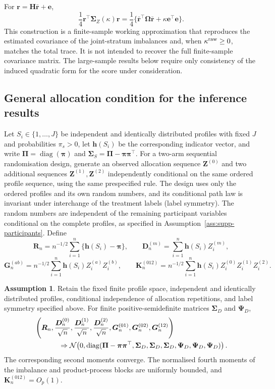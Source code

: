 \documentclass[12pt,a4paper]{article}
\theoremstyle{definition}
\newtheorem{assumption}{Assumption}
\theoremstyle{remark}\newtheorem{remark}{Remark}
\numberwithin{equation}{section}
\newcommand{\diag}{\operatorname{diag}}
\begin{document}
For $\bm r=\bm H\bar{\bm r}+\bm e$,
\begin{equation}\label{eq:supp-quadratic}
\frac14\bm r^\top\bm\Sigma_Z(\kappa)\bm r
=\frac14\{\bar{\bm r}^\top\bm\Omega\bar{\bm r}
+\kappa\bm e^\top\bm e\}.
\end{equation}
This construction is a finite-sample working approximation that reproduces the estimated covariance of the joint-stratum imbalances and, when $\kappa^{\rm raw}\ge0$, matches the total trace. It is not intended to recover the full finite-sample covariance matrix. The large-sample results below require only consistency of the induced quadratic form for the score under consideration.

\subsection{General allocation condition for the inference results}\label{sec:supp-general-allocation}
Let $S_i\in\{1,\ldots,J\}$ be independent and identically distributed profiles with fixed $J$ and probabilities $\pi_s>0$, let $\bm h(S_i)$ be the corresponding indicator vector, and write $\bm\Pi=\diag(\bm\pi)$ and $\bm\Sigma_S=\bm\Pi-\bm\pi\bm\pi^\top$. For a two-arm sequential randomisation design, generate an observed allocation sequence $\bm Z^{(0)}$ and two additional sequences $\bm Z^{(1)},\bm Z^{(2)}$ independently conditional on the same ordered profile sequence, using the same prespecified rule. The design uses only the ordered profiles and its own random numbers, and its conditional path law is invariant under interchange of the treatment labels (label symmetry). The random numbers are independent of the remaining participant variables conditional on the complete profiles, as specified in Assumption~\ref{ass:supp-participants}. Define
\[
 \bm R_n=n^{-1/2}\sum_{i=1}^n\{\bm h(S_i)-\bm\pi\},\qquad
 \bm D_n^{(m)}=\sum_{i=1}^n\bm h(S_i)Z_i^{(m)},
\]
\[
 \bm G_n^{(ab)}=n^{-1/2}\sum_{i=1}^n\bm h(S_i)Z_i^{(a)}Z_i^{(b)},\qquad
 \bm K_n^{(012)}=n^{-1/2}\sum_{i=1}^n\bm h(S_i)Z_i^{(0)}Z_i^{(1)}Z_i^{(2)}.
\]

\begin{assumption}\label{ass:supp-general-allocation}
Retain the fixed finite profile space, independent and identically distributed profiles, conditional independence of allocation repetitions, and label symmetry specified above. For finite positive-semidefinite matrices $\bm\Sigma_D$ and $\bm\Psi_D$,
\begin{align*}
 &\left(\bm R_n,\frac{\bm D_n^{(0)}}{\sqrt n},\frac{\bm D_n^{(1)}}{\sqrt n},
 \frac{\bm D_n^{(2)}}{\sqrt n},\bm G_n^{(01)},\bm G_n^{(02)},\bm G_n^{(12)}\right)\\
 &\hspace{12mm}\Rightarrow
 \mathcal N\!\left(0,\diag(\bm\Pi-\bm\pi\bm\pi^\top,
 \bm\Sigma_D,\bm\Sigma_D,\bm\Sigma_D,
 \bm\Psi_D,\bm\Psi_D,\bm\Psi_D)\right).
\end{align*}
The corresponding second moments converge. The normalised fourth moments of the imbalance and product-process blocks are uniformly bounded, and $\bm K_n^{(012)}=O_p(1)$.
\end{assumption}
\end{document}
